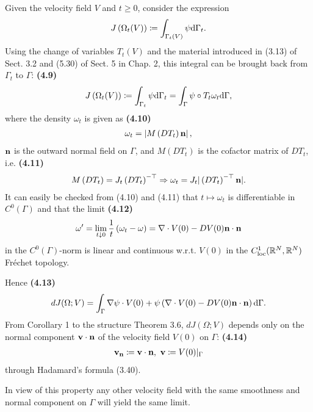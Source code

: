 \documentclass[oneside]{book}
\numberwithin{equation}{section}
\begin{document}
Given the velocity field $V$ and $t\ge 0$, consider the expression
\begin{align*}
    J\left(\Omega_t(V)\right)\coloneqq\int_{\Gamma_t(V)} \psi{\rm d}\Gamma_t.
\end{align*}
Using the change of variables $T_t(V)$ and the material introduced in (3.13) of Sect. 3.2 and (5.30) of Sect. 5 in Chap. 2, this integral can be brought back from $\Gamma_t$ to $\Gamma$: \textbf{(4.9)}
\begin{align*}
    J\left(\Omega_t(V)\right)\coloneqq\int_{\Gamma_t} \psi{\rm d}\Gamma_t = \int_\Gamma \psi\circ T_t\omega_t{\rm d}\Gamma,
\end{align*}
where the density $\omega_t$ is given as \textbf{(4.10)}
\begin{align*}
    \omega_t = \left|M\left(DT_t\right){\bf n}\right|,
\end{align*}
${\bf n}$ is the outward normal field on $\Gamma$, and $M(DT_t)$ is the cofactor matrix of $DT_t$, i.e. \textbf{(4.11)}
\begin{align*}
    M\left(DT_t\right) = J_t\left(DT_t\right)^{-\top}\Rightarrow\omega_t = J_t|\left(DT_t\right)^{-\top}{\bf n}|.
\end{align*}
It can easily be checked from (4.10) and (4.11) that $t\mapsto\omega_t$ is differentiable in $C^0(\Gamma)$ and that the limit \textbf{(4.12)}
\begin{align*}
    \omega' = \lim_{t\downarrow 0} \frac{1}{t}\left(\omega_t - \omega\right) = \nabla\cdot V(0) - DV(0){\bf n}\cdot{\bf n}
\end{align*}
in the $C^0(\Gamma)$-norm is linear and continuous w.r.t. $V(0)$ in the $C_{\rm loc}^1(\mathbb{R}^N,\mathbb{R}^N)$ Fréchet topology.

Hence \textbf{(4.13)}
\begin{align*}
    dJ(\Omega;V) = \int_\Gamma \nabla\psi\cdot V(0) + \psi\left(\nabla\cdot V(0) - DV(0){\bf n}\cdot{\bf n}\right){\rm d}\Gamma.
\end{align*}
From Corollary 1 to the structure Theorem 3.6, $dJ(\Omega;V)$ depends only on the normal component ${\bf v}\cdot{\bf n}$ of the velocity field $V(0)$ on $\Gamma$: \textbf{(4.14)}
\begin{align*}
    {\bf v}_{\bf n}\coloneqq{\bf v}\cdot{\bf n},\ {\bf v}\coloneqq V(0)|_\Gamma
\end{align*}
through Hadamard's formula (3.40).

In view of this property any other velocity field with the same smoothness and normal component on $\Gamma$ will yield the same limit.
\end{document}
